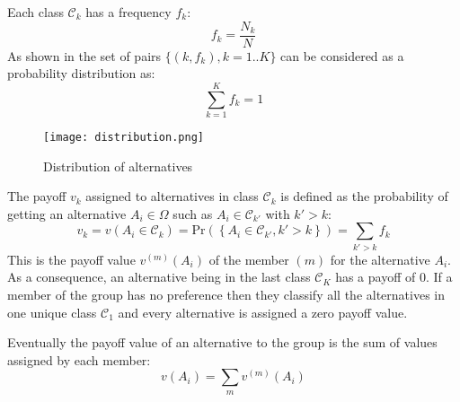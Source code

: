 \documentclass[12pt,a4paper]{article}
\begin{document}
Each class $\mathcal{C}_k$ has a frequency $f_k$:
\begin{equation}
f_k = \frac{N_k}{N}
\end{equation}
As shown in the set of pairs $\{(k,f_k), k=1..K\}$ can be considered as a probability distribution as:
\begin{equation}
\sum_{k=1}^K{f_k} = 1
\end{equation}

\begin{figure}[h]
\centering
\texttt{[image: distribution.png]}
\caption{Distribution of alternatives}
\label{fig:distribution}  
\end{figure}
The payoff $v_k$ assigned to alternatives in class $\mathcal{C}_k$ is defined as the probability of getting an alternative $A_i\in\Omega$ such as $A_i\in\mathcal{C}_{k'}$ with $k'>k$:
\begin{equation}
v_k = v\left(A_i\in\mathcal{C}_k\right)=\mathrm{Pr}\left(\left\lbrace A_i\in\mathcal{C}_{k'}, k'>k\right\rbrace\right)=\sum_{k'>k}{f_k}
\end{equation}
This is the payoff value $v^{(m)}(A_i)$ of the member $(m)$ for the alternative $A_i$.
As a consequence, an alternative being in the last class $\mathcal{C}_K$ has a payoff of 0. If a member of the group has no preference then they classify all the alternatives in one unique class $\mathcal{C}_1$ and every alternative is assigned a zero payoff value.

Eventually the payoff value of an alternative to the group is the sum of values assigned by each member:
\begin{equation}
v\left(A_i\right)=\sum_{m}{v^{(m)}(A_i)}
\end{equation}
\end{document}
